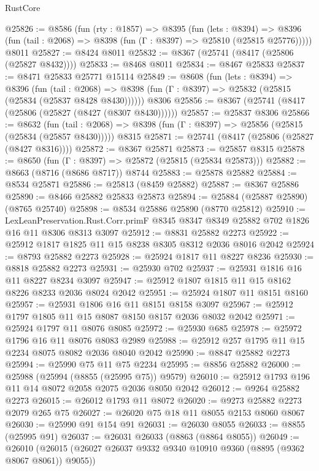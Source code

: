 \begin{lexlean}{RustCore}
\begin{coremodule}
@25826 := @8586
    (fun (rty : @1857) =>
    @8395
      (fun (lets : @8394) =>
      @8396 (fun (tail : @2068) => @8398 (fun (Γ : @8397) => @25810 (@25815 @25776)))))
    @8011
@25827 := @8424 @8011
@25832 := @8367 (@25741 (@8417 (@25806 (@25827 @8432))))
@25833 := @8468 @8011
@25834 := @8467 @25833
@25837 := @8471 @25833 @25771 @15114
@25849 := @8608
    (fun (lets : @8394) =>
    @8396
      (fun (tail : @2068) =>
      @8398 (fun (Γ : @8397) => @25832 (@25815 (@25834 (@25837 @8428 @8430))))))
    @8306
@25856 := @8367 (@25741 (@8417 (@25806 (@25827 (@8427 (@8307 @8430))))))
@25857 := @25837 @8306
@25866 := @8632
    (fun (tail : @2068) => @8398 (fun (Γ : @8397) => @25856 (@25815 (@25834 (@25857 @8430)))))
    @8315
@25871 := @25741 (@8417 (@25806 (@25827 (@8427 @8316))))
@25872 := @8367 @25871
@25873 := @25857 @8315
@25878 := @8650 (fun (Γ : @8397) => @25872 (@25815 (@25834 @25873)))
@25882 := @8663 (@8716 (@8686 @8717)) @8744
@25883 := @25878 @25882
@25884 := @8534 @25871
@25886 := @25813 (@8459 @25882)
@25887 := @8367 @25886
@25890 := @8466 @25882 @25833 @25873
@25894 := @25884 (@25887 @25890) (@8765 @25740)
@25898 := @8534 @25886 @25890 (@8770 @25812)
@25910 := LexLeanPreservation.Rust.Corr.primF
    @8345
    @8347
    @8349
    @25882
    @702
    @1826
    @16
    @11
    @8306
    @8313
    @3097
@25912 := @8831 @25882 @2273
@25922 := @25912 @1817 @1825 @11 @15 @8238 @8305 @8312 @2036 @8016 @2042
@25924 := @8793 @25882 @2273
@25928 := @25924 @1817 @11 @8227 @8236
@25930 := @8818 @25882 @2273
@25931 := @25930 @702
@25937 := @25931 @1816 @16 @11 @8227 @8234 @3097
@25947 := @25912 @1807 @1815 @11 @15 @8162 @8226 @8233 @2036 @8024 @2042
@25951 := @25924 @1807 @11 @8151 @8160
@25957 := @25931 @1806 @16 @11 @8151 @8158 @3097
@25967 := @25912 @1797 @1805 @11 @15 @8087 @8150 @8157 @2036 @8032 @2042
@25971 := @25924 @1797 @11 @8076 @8085
@25972 := @25930 @685
@25978 := @25972 @1796 @16 @11 @8076 @8083 @2989
@25988 := @25912 @257 @1795 @11 @15 @2234 @8075 @8082 @2036 @8040 @2042
@25990 := @8847 @25882 @2273
@25994 := @25990 @75 @11 @75 @2234
@25995 := @8856 @25882
@26000 := @25988 (@25994 (@8855 (@25995 @75)) @9579)
@26010 := @25912 @1793 @196 @11 @14 @8072 @2058 @2075 @2036 @8050 @2042
@26012 := @9264 @25882 @2273
@26015 := @26012 @1793 @11 @8072
@26020 := @9273 @25882 @2273 @2079 @265 @75
@26027 := @26020 @75 @18 @11 @8055 @2153 @8060 @8067
@26030 := @25990 @91 @154 @91
@26031 := @26030 @8055
@26033 := @8855 (@25995 @91)
@26037 := @26031 @26033 (@8863 (@8864 @8055))
@26049 := @26010 (@26015 (@26027 @26037 @9332 @9340 @10910 @9360 (@8895 (@9362 @8067 @8061)) @9055))

\end{coremodule}
\end{lexlean}
